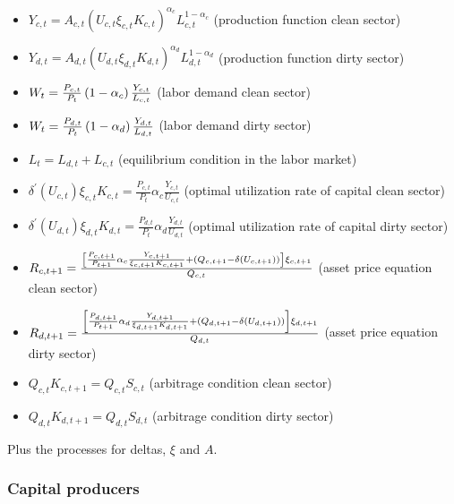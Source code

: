 \documentclass{article}
\begin{document}
\begin{itemize}
\item $Y_{c,t}=A_{c,t}\left( U_{c,t}\xi _{c,t}K_{c,t}\right) ^{\alpha
_{c}}L_{c,t}^{1-\alpha _{c}}$ (production function clean sector)

\item $Y_{d,t}=A_{d,t}\left( U_{d,t}\xi _{d,t}K_{d,t}\right) ^{\alpha
_{d}}L_{d,t}^{1-\alpha _{d}}$ (production function dirty sector)

\item $W_{t}=\frac{P_{c,t}}{P_{t}}\left( 1-\alpha _{c}\right) \frac{Y_{c,t}}{%
L_{c,t}}$ (labor demand clean sector)

\item $W_{t}=\frac{P_{d,t}}{P_{t}}\left( 1-\alpha _{d}\right) \frac{Y_{d,t}}{%
L_{d,t}}$ (labor demand dirty sector)

\item $L_{t}=L_{d,t}+L_{c,t}$ (equilibrium condition in the labor market)

\item $\delta ^{\prime }(U_{c,t})\xi _{c,t}K_{c,t}=\frac{P_{c,t}}{P_{t}}%
\alpha _{c}\frac{Y_{c,t}}{U_{c,t}}$ (optimal utilization rate of capital
clean sector)

\item $\delta ^{\prime }(U_{d,t})\xi _{d,t}K_{d,t}=\frac{P_{d,t}}{P_{t}}%
\alpha _{d}\frac{Y_{d,t}}{U_{d,t}}$ (optimal utilization rate of capital
dirty sector)

\item $R_{c,t+1}=\frac{\left[ \frac{P_{c,t+1}}{P_{t+1}}\alpha _{c}\frac{%
Y_{c,t+1}}{\xi _{c,t+1}K_{c,t+1}}+\left( Q_{c,t+1}-\delta (U_{c,t+1})\right) %
\right] \xi _{c,t+1}}{Q_{c,t}}$ (asset price equation clean sector)

\item $R_{d,t+1}=\frac{\left[ \frac{P_{d,t+1}}{P_{t+1}}\alpha _{d}\frac{%
Y_{d,t+1}}{\xi _{d,t+1}K_{d,t+1}}+\left( Q_{d,t+1}-\delta (U_{d,t+1})\right) %
\right] \xi _{d,t+1}}{Q_{d,t}}$ (asset price equation dirty sector)

\item $Q_{c,t}K_{c,t+1}=Q_{c,t}S_{c,t}$ (arbitrage condition clean sector)

\item $Q_{d,t}K_{d,t+1}=Q_{d,t}S_{d,t}$ (arbitrage condition dirty sector)
\end{itemize}

Plus the processes for deltas, $\xi $ and $A$.

\subsubsection{Capital producers}
\end{document}
